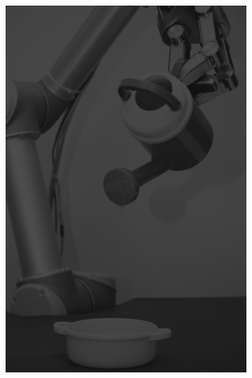 \begin{figure}[H]
\begin{subfigure}[b]{0.1\textwidth}
        \includegraphics[width=\textwidth]{img3/test/contrast_5_0_3_final_img3.png}
    \end{subfigure}
    \begin{subfigure}[b]{0.1\textwidth}

\end{subfigure}
\end{figure}
